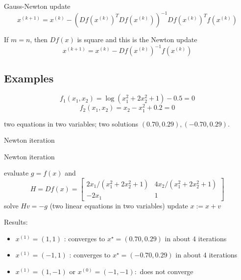 Gauss-Newton update
\begin{equation}
x^{(k+1)}=x^{(k)}-\left(D f\left(x^{(k)}\right)^{T} D f\left(x^{(k)}\right)\right)^{-1} D f\left(x^{(k)}\right)^{T} f\left(x^{(k)}\right)
\end{equation}

If $ m=n $, then $ D f(x) $ is square and this is the Newton update
\begin{equation}
x^{(k+1)}=x^{(k)}-D f\left(x^{(k)}\right)^{-1} f\left(x^{(k)}\right)
\end{equation}

\subsection{Examples}

\begin{example}
    \begin{equation} f_{1}\left(x_{1}, x_{2}\right)=\log \left(x_{1}^{2}+2 x_{2}^{2}+1\right)-0.5=0 \end{equation}
\begin{equation} f_{2}\left(x_{1}, x_{2}\right)=x_{2}-x_{1}^{2}+0.2=0 \end{equation}

two equations in two variables; two solutions $ (0.70,0.29),(-0.70,0.29) $.

Newton iteration

\begin{algorithm}[htbp]
    \caption{Newton iteration}
    evaluate $ g=f(x) $ and
\begin{equation}
H=D f(x)=\left[\begin{array}{cc}
2 x_{1} /\left(x_{1}^{2}+2 x_{2}^{2}+1\right) & 4 x_{2} /\left(x_{1}^{2}+2 x_{2}^{2}+1\right) \\
-2 x_{1} & 1
\end{array}\right]
\end{equation}\;
solve $ H v=-g $ (two linear equations in two variables)\;
update $ x:=x+v $\;
\end{algorithm}


Results: 

\begin{itemize}
    \item $ x^{(1)}=(1,1) $ : converges to $ x^{\star}=(0.70,0.29) $ in about 4 iterations
    \item $ x^{(1)}=(-1,1) $ : converges to $ x^{\star}=(-0.70,0.29) $ in about 4 iterations
    \item $ x^{(1)}=(1,-1) $ or $ x^{(0)}=(-1,-1): $ does not converge
\end{itemize}

\end{example}

